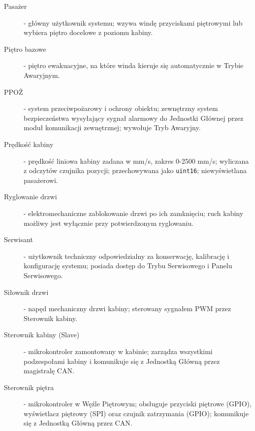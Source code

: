 \documentclass[a4paper,12pt]{article}
\begin{document}
\begin{description}
  \item[Pasażer] - główny użytkownik systemu; wzywa windę przyciskami piętrowymi lub wybiera piętro docelowe z poziomu kabiny.

  \item[Piętro bazowe] - piętro ewakuacyjne, na które winda kieruje się automatycznie w Trybie Awaryjnym.

  \item[PPOŻ] - system przeciwpożarowy i ochrony obiektu; zewnętrzny system bezpieczeństwa wysyłający sygnał alarmowy do Jednostki Głównej przez moduł komunikacji zewnętrznej; wywołuje Tryb Awaryjny.

  \item[Prędkość kabiny] - prędkość liniowa kabiny zadana w mm/s, zakres 0-2500 mm/s; wyliczana z odczytów czujnika pozycji; przechowywana jako \texttt{uint16}; niewyświetlana pasażerowi.


  \item[Ryglowanie drzwi] - elektromechaniczne zablokowanie drzwi po ich zamknięciu; ruch kabiny możliwy jest wyłącznie przy potwierdzonym ryglowaniu.

  \item[Serwisant] - użytkownik techniczny odpowiedzialny za konserwację, kalibrację i konfigurację systemu; posiada dostęp do Trybu Serwisowego i Panelu Serwisowego.

  \item[Siłownik drzwi] - napęd mechaniczny drzwi kabiny; sterowany sygnałem PWM przez Sterownik kabiny.


  \item[Sterownik kabiny (Slave)] - mikrokontroler zamontowany w kabinie; zarządza wszystkimi podzespołami kabiny i komunikuje się z Jednostką Główną przez magistralę CAN.

  \item[Sterownik piętra] - mikrokontroler w Węźle Piętrowym; obsługuje przyciski piętrowe (GPIO), wyświetlacz piętrowy (SPI) oraz czujnik zatrzymania (GPIO); komunikuje się z Jednostką Główną przez CAN.


\end{description}
\end{document}
